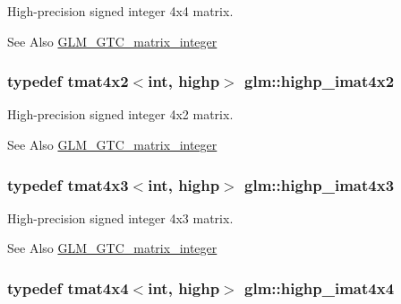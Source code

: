 High-\/precision signed integer 4x4 matrix. \begin{DoxySeeAlso}{See Also}
\hyperlink{group__gtc__matrix__integer}{G\-L\-M\-\_\-\-G\-T\-C\-\_\-matrix\-\_\-integer} 
\end{DoxySeeAlso}
\hypertarget{group__gtc__matrix__integer_ga7b936ac315e12b546d2597a4bffee4a1}{
\subsubsection[{highp\-\_\-imat4x2}]{\setlength{\rightskip}{0pt plus 5cm}typedef tmat4x2$<$int, highp$>$ {\bf glm\-::highp\-\_\-imat4x2}}}\label{group__gtc__matrix__integer_ga7b936ac315e12b546d2597a4bffee4a1}
High-\/precision signed integer 4x2 matrix. \begin{DoxySeeAlso}{See Also}
\hyperlink{group__gtc__matrix__integer}{G\-L\-M\-\_\-\-G\-T\-C\-\_\-matrix\-\_\-integer} 
\end{DoxySeeAlso}
\hypertarget{group__gtc__matrix__integer_ga28e21d3fe05d8476402e27081150cade}{
\subsubsection[{highp\-\_\-imat4x3}]{\setlength{\rightskip}{0pt plus 5cm}typedef tmat4x3$<$int, highp$>$ {\bf glm\-::highp\-\_\-imat4x3}}}\label{group__gtc__matrix__integer_ga28e21d3fe05d8476402e27081150cade}
High-\/precision signed integer 4x3 matrix. \begin{DoxySeeAlso}{See Also}
\hyperlink{group__gtc__matrix__integer}{G\-L\-M\-\_\-\-G\-T\-C\-\_\-matrix\-\_\-integer} 
\end{DoxySeeAlso}
\hypertarget{group__gtc__matrix__integer_ga2a80b8ab686297145ecf713699233114}{
\subsubsection[{highp\-\_\-imat4x4}]{\setlength{\rightskip}{0pt plus 5cm}typedef tmat4x4$<$int, highp$>$ {\bf glm\-::highp\-\_\-imat4x4}}}\label{group__gtc__matrix__integer_ga2a80b8ab686297145ecf713699233114}
